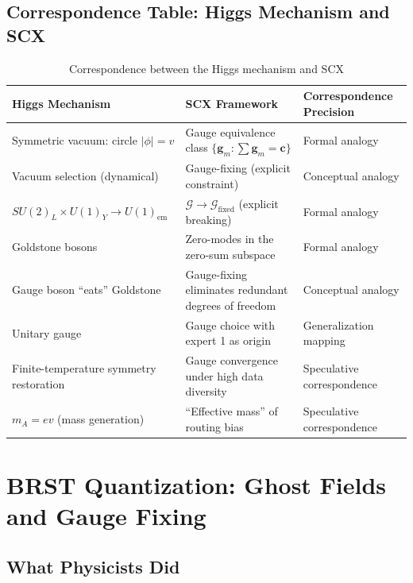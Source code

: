 \documentclass[12pt,a4paper]{article}
\theoremstyle{remark}
\newcommand{\gaugeparam}{\mathbf{g}}
\newcommand{\calG}{\mathcal{G}}
\begin{document}
\subsection{Correspondence Table: Higgs Mechanism and SCX}

\begin{table}[H]
\centering
\caption{Correspondence between the Higgs mechanism and SCX}
\label{tab:higgs_correspondence}
\begin{tabular}{p{4.5cm} p{4.5cm} p{4.5cm}}
\toprule
\textbf{Higgs Mechanism} & \textbf{SCX Framework} & \textbf{Correspondence Precision} \\
\midrule
Symmetric vacuum: circle $|\phi|=v$ & Gauge equivalence class $\{\gaugeparam_m: \sum\gaugeparam_m=\mathbf{c}\}$ & Formal analogy \\
Vacuum selection (dynamical) & Gauge-fixing (explicit constraint) & Conceptual analogy \\
$SU(2)_L \times U(1)_Y \to U(1)_{\text{em}}$ & $\calG \to \calG_{\text{fixed}}$ (explicit breaking) & Formal analogy \\
Goldstone bosons & Zero-modes in the zero-sum subspace & Formal analogy \\
Gauge boson ``eats'' Goldstone & Gauge-fixing eliminates redundant degrees of freedom & Conceptual analogy \\
Unitary gauge & Gauge choice with expert 1 as origin & Generalization mapping \\
Finite-temperature symmetry restoration & Gauge convergence under high data diversity & Speculative correspondence \\
$m_A = ev$ (mass generation) & ``Effective mass'' of routing bias & Speculative correspondence \\
\bottomrule
\end{tabular}
\end{table}

\newpage

\section{BRST Quantization: Ghost Fields and Gauge Fixing}

\subsection{What Physicists Did}
\end{document}
